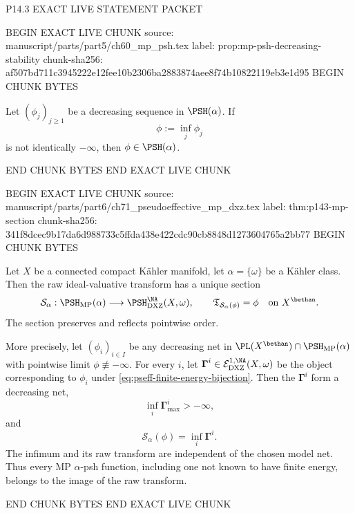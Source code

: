 P14.3 EXACT LIVE STATEMENT PACKET

BEGIN EXACT LIVE CHUNK
source: manuscript/parts/part5/ch60_mp_psh.tex
label: prop:mp-psh-decreasing-stability
chunk-sha256: af507bd711c3945222e12fee10b2306ba2883874aee8f74b10822119eb3e1d95
BEGIN CHUNK BYTES
\begin{proposition}
\label{prop:mp-psh-decreasing-stability}
Let \((\phi_j)_{j\geq1}\) be a decreasing sequence in
\(\PSH(\alpha)\).  If
\[
                         \phi:=\inf_j\phi_j
\]
is not identically \(-\infty\), then \(\phi\in\PSH(\alpha)\).
\end{proposition}
END CHUNK BYTES
END EXACT LIVE CHUNK

BEGIN EXACT LIVE CHUNK
source: manuscript/parts/part6/ch71_pseudoeffective_mp_dxz.tex
label: thm:p143-mp-section
chunk-sha256: 341f8dcec9b17da6d988733c5ffda438e422cdc90cb8848d1273604765a2bb77
BEGIN CHUNK BYTES
\begin{theorem}\label{thm:p143-mp-section}
Let \(X\) be a connected compact K\"ahler manifold, let
\(\alpha=\{\omega\}\) be a K\"ahler class.  Then the raw
ideal-valuative transform has a unique section
\[
 \mathcal S_\alpha:\PSH_{\mathrm{MP}}(\alpha)
        \longrightarrow\PSH^{\NA}_{\mathrm{DXZ}}(X,\omega),
 \qquad
 \mathfrak T_{\mathcal S_\alpha(\phi)}=\phi
 \quad\text{on }X^{\bethan}.
\]
The section preserves and reflects pointwise order.

More precisely, let \((\phi_i)_{i\in I}\) be any decreasing net in
\(\PL(X^{\bethan})\cap\PSH_{\mathrm{MP}}(\alpha)\) with pointwise limit
\(\phi\not\equiv-\infty\).  For every \(i\), let
\(\boldsymbol\Gamma^i\in
\mathcal E^{1,\NA}_{\mathrm{DXZ}}(X,\omega)\) be the object corresponding
to \(\phi_i\) under \eqref{eq:pseff-finite-energy-bijection}.  Then the
\(\boldsymbol\Gamma^i\) form a decreasing net,
\[
                 \inf_i\boldsymbol\Gamma^i_{\max}>-\infty,
\]
and
\[
                 \mathcal S_\alpha(\phi)
                 =\inf_i\boldsymbol\Gamma^i.
\]
The infimum and its raw transform are independent of the chosen model net.
Thus every MP \(\alpha\)-psh function, including one not known to have
finite energy, belongs to the image of the raw transform.
\end{theorem}
END CHUNK BYTES
END EXACT LIVE CHUNK

